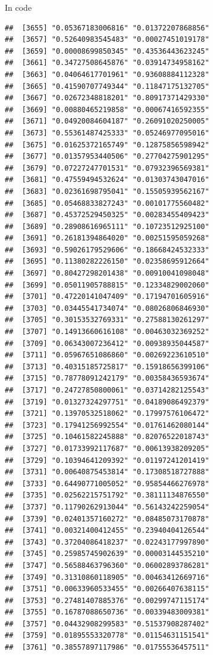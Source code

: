 \documentclass[ignorenonframetext,]{beamer}
\begin{document}
\begin{frame}[fragile]{In code}
\begin{verbatim}
##  [3655] "0.05367183006816" "0.01372207868856"
##  [3657] "0.52640983545483" "0.00027451019178"
##  [3659] "0.00008699850345" "0.43536443623245"
##  [3661] "0.34727508645876" "0.03914734958162"
##  [3663] "0.04064617701961" "0.93608884112328"
##  [3665] "0.41590707749344" "0.11847175132705"
##  [3667] "0.02672348818201" "0.80917371429330"
##  [3669] "0.00880465219858" "0.00067416592355"
##  [3671] "0.04920084604187" "0.26091020250005"
##  [3673] "0.55361487425333" "0.05246977095016"
##  [3675] "0.01625372165749" "0.12875856598942"
##  [3677] "0.01357953440506" "0.27704275901295"
##  [3679] "0.07227247701531" "0.07932396569381"
##  [3681] "0.47559494532624" "0.01303743047016"
##  [3683] "0.02361698795041" "0.15505939562167"
##  [3685] "0.05468833827243" "0.00101775560482"
##  [3687] "0.45372529450325" "0.00283455409423"
##  [3689] "0.28908616965111" "0.10723512925100"
##  [3691] "0.26181394864020" "0.00251595059268"
##  [3693] "0.59026179529606" "0.18668424532333"
##  [3695] "0.11380282226150" "0.02358695912664"
##  [3697] "0.80427298201438" "0.00910041098048"
##  [3699] "0.05011905788815" "0.12334829002060"
##  [3701] "0.47220141047409" "0.17194701605916"
##  [3703] "0.03445541734074" "0.08026806846930"
##  [3705] "0.30153532769331" "0.27588130261297"
##  [3707] "0.14913660616108" "0.00463032369252"
##  [3709] "0.06343007236412" "0.00938935044587"
##  [3711] "0.05967651086860" "0.00269223610510"
##  [3713] "0.40315185725817" "0.15918656399106"
##  [3715] "0.78778091242179" "0.00358436593674"
##  [3717] "0.24727850800061" "0.03714282125543"
##  [3719] "0.01327324297751" "0.04189086492379"
##  [3721] "0.13970532518062" "0.17997576106472"
##  [3723] "0.17941256992554" "0.01761462080144"
##  [3725] "0.10461582245888" "0.82076522018743"
##  [3727] "0.01733992117687" "0.00613938209205"
##  [3729] "0.10394641209392" "0.01197241201419"
##  [3731] "0.00640875453814" "0.17308518727888"
##  [3733] "0.64490771005052" "0.95854466276978"
##  [3735] "0.02562215751792" "0.38111134876550"
##  [3737] "0.11790262913044" "0.56143242259054"
##  [3739] "0.02401357160272" "0.08485073170878"
##  [3741] "0.00321400412455" "0.23940404126544"
##  [3743] "0.37204086418237" "0.02243177997890"
##  [3745] "0.25985745902639" "0.00003144535210"
##  [3747] "0.56588463796360" "0.06002893786281"
##  [3749] "0.31310860118905" "0.00463412669716"
##  [3751] "0.00633960533455" "0.00266407638115"
##  [3753] "0.27481407885376" "0.00299747115174"
##  [3755] "0.16787088650736" "0.00339483009381"
##  [3757] "0.04432908299583" "0.51537908287402"
##  [3759] "0.01895553320778" "0.01154631151541"
##  [3761] "0.38557897117986" "0.01755536457511"

\end{verbatim}
\end{frame}
\end{document}
